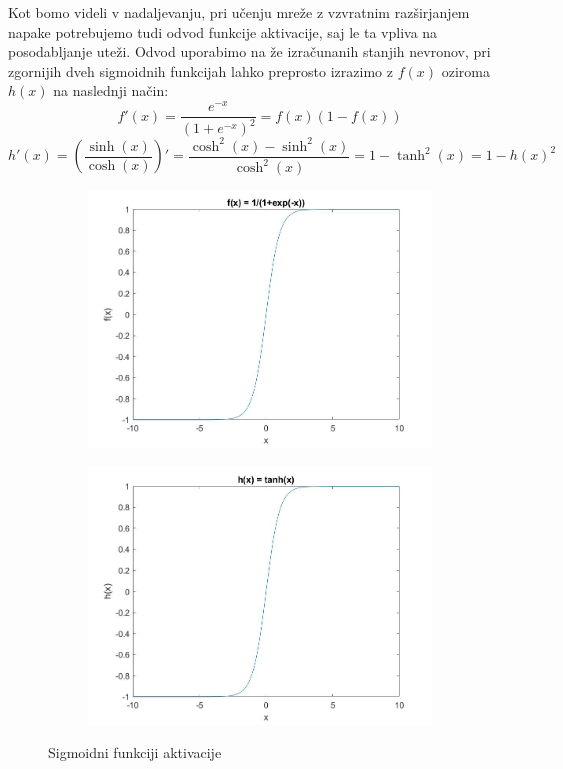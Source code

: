 \documentclass[mat1]{fmfdelo}
\begin{document}
Kot bomo videli v nadaljevanju, pri učenju mreže z vzvratnim razširjanjem napake potrebujemo tudi odvod funkcije aktivacije, saj le ta vpliva na posodabljanje uteži. Odvod uporabimo na že izračunanih stanjih nevronov, pri zgornijih dveh sigmoidnih funkcijah lahko preprosto izrazimo z $f(x)$ oziroma $h(x)$ na naslednji način:
%
\begin{equation}
f'(x) = \frac{e^{-x}}{(1+e^{-x})^2} = f(x)(1-f(x))
\end{equation}
%
\begin{equation}
h'(x) = \left(\frac{\sinh(x)}{\cosh(x)}\right)' = \frac{\cosh^2(x)- \sinh^2(x)}{\cosh^2(x)} = 1 - \tanh^2(x) = 1 - h(x)^2 
\end{equation}
%
\begin{figure}[!th]
\centering
\begin{subfigure}{.5\textwidth}
  \centering
  \includegraphics[width=.9\linewidth]{sig_exp.jpg}
\end{subfigure}%
\begin{subfigure}{.5\textwidth}
  \centering
  \includegraphics[width=.9\linewidth]{sig_tan.jpg}
\end{subfigure}
\caption{Sigmoidni funkciji aktivacije}
\label{fig:sigmoid}
\end{figure}
%
\end{document}
